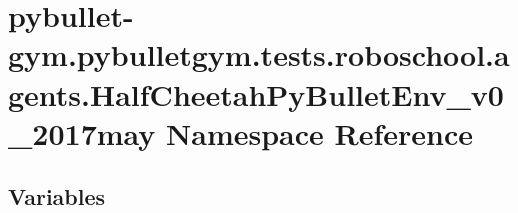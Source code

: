 \hypertarget{namespacepybullet-gym_1_1pybulletgym_1_1tests_1_1roboschool_1_1agents_1_1_half_cheetah_py_bullet_env__v0__2017may}{}\section{pybullet-\/gym.pybulletgym.\+tests.\+roboschool.\+agents.\+Half\+Cheetah\+Py\+Bullet\+Env\+\_\+v0\+\_\+2017may Namespace Reference}
\label{namespacepybullet-gym_1_1pybulletgym_1_1tests_1_1roboschool_1_1agents_1_1_half_cheetah_py_bullet_env__v0__2017may}
\subsection*{Variables}

